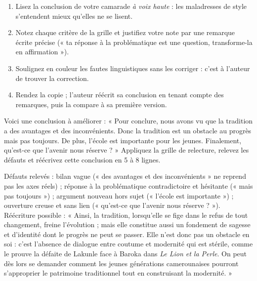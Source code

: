 \documentclass[11pt]{article}
\begin{document}
\begin{methode}
\begin{enumerate}
\item Lisez la conclusion de votre camarade \emph{à voix haute} : les maladresses de style s'entendent mieux qu'elles ne se lisent.
\item Notez chaque critère de la grille et justifiez votre note par une remarque écrite précise (« ta réponse à la problématique est une question, transforme-la en affirmation »).
\item Soulignez en couleur les fautes linguistiques sans les corriger : c'est à l'auteur de trouver la correction.
\item Rendez la copie ; l'auteur réécrit sa conclusion en tenant compte des remarques, puis la compare à sa première version.
\end{enumerate}
\end{methode}

\begin{exercice}
Voici une conclusion à améliorer : « Pour conclure, nous avons vu que la tradition a des avantages et des inconvénients. Donc la tradition est un obstacle au progrès mais pas toujours. De plus, l'école est importante pour les jeunes. Finalement, qu'est-ce que l'avenir nous réserve ? » Appliquez la grille de relecture, relevez les défauts et réécrivez cette conclusion en 5 à 8 lignes.
\end{exercice}

\begin{corrige}
Défauts relevés : bilan vague (« des avantages et des inconvénients » ne reprend pas les axes réels) ; réponse à la problématique contradictoire et hésitante (« mais pas toujours ») ; argument nouveau hors sujet (« l'école est importante ») ; ouverture creuse et sans lien (« qu'est-ce que l'avenir nous réserve ? »). Réécriture possible : « Ainsi, la tradition, lorsqu'elle se fige dans le refus de tout changement, freine l'évolution ; mais elle constitue aussi un fondement de sagesse et d'identité dont le progrès ne peut se passer. Elle n'est donc pas un obstacle en soi : c'est l'absence de dialogue entre coutume et modernité qui est stérile, comme le prouve la défaite de Lakunle face à Baroka dans \emph{Le Lion et la Perle}. On peut dès lors se demander comment les jeunes générations camerounaises pourront s'approprier le patrimoine traditionnel tout en construisant la modernité. »
\end{corrige}
\end{document}
